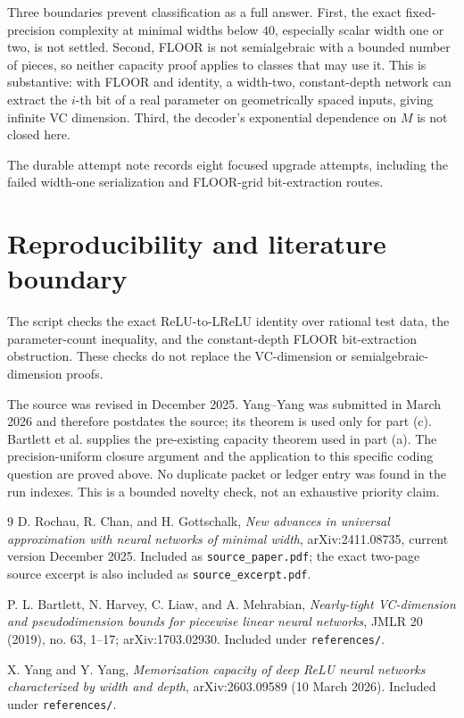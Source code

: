 \documentclass[10pt]{article}
\begin{document}
Three boundaries prevent classification as a full answer.  First, the exact
fixed-precision complexity at minimal widths below $40$, especially scalar
width one or two, is not settled.  Second, FLOOR is not semialgebraic with a
bounded number of pieces, so neither capacity proof applies to classes that
may use it.  This is substantive: with FLOOR and identity, a width-two,
constant-depth network can extract the $i$-th bit of a real parameter on
geometrically spaced inputs, giving infinite VC dimension.  Third, the
decoder's exponential dependence on $M$ is not closed here.

The durable attempt note records eight focused upgrade attempts, including
the failed width-one serialization and FLOOR-grid bit-extraction routes.

\section*{Reproducibility and literature boundary}

The script  checks the exact
ReLU-to-LReLU identity over rational test data, the parameter-count inequality,
and the constant-depth FLOOR bit-extraction obstruction.  These checks do not
replace the VC-dimension or semialgebraic-dimension proofs.

The source was revised in December 2025.  Yang--Yang was submitted in March
2026 and therefore postdates the source; its theorem is used only for part
(c).  Bartlett et al. supplies the pre-existing capacity theorem used in
part (a).  The precision-uniform closure argument and the application to this
specific coding question are proved above.  No duplicate packet or ledger
entry was found in the run indexes.  This is a bounded novelty check, not an
exhaustive priority claim.

\begin{thebibliography}{9}
D. Rochau, R. Chan, and H. Gottschalk,
\emph{New advances in universal approximation with neural networks of
minimal width}, arXiv:2411.08735, current version December 2025.
Included as \texttt{source\_paper.pdf}; the exact two-page source excerpt is
also included as \texttt{source\_excerpt.pdf}.

P. L. Bartlett, N. Harvey, C. Liaw, and A. Mehrabian,
\emph{Nearly-tight VC-dimension and pseudodimension bounds for piecewise
linear neural networks}, JMLR 20 (2019), no. 63, 1--17;
arXiv:1703.02930.  Included under \texttt{references/}.

X. Yang and Y. Yang,
\emph{Memorization capacity of deep ReLU neural networks characterized by
width and depth}, arXiv:2603.09589 (10 March 2026).
Included under \texttt{references/}.
\end{thebibliography}
\end{document}
